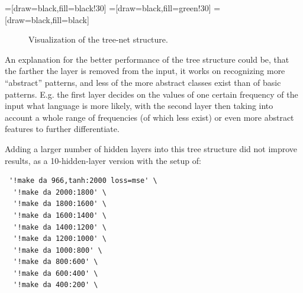 =[draw=black,fill=black!30]
=[draw=black,fill=green!30]
=[draw=black,fill=black]
\begin{figure}[htbp]
   \centering
   \caption{Visualization of the tree-net structure.}
   \label{fig:treeNet}
\end{figure}

An explanation for the better performance of the tree structure could be, that the farther the layer is removed from the input, it works on recognizing more ``abstract'' patterns, and less of the more abstract classes exist than of basic patterns. E.g. the first layer decides on the values of one certain frequency of the input what language is more likely, with the second layer then taking into account a whole range of frequencies (of which less exist) or even more abstract features to further differentiate.

Adding a larger number of hidden layers into this tree structure did not improve results, as a 10-hidden-layer version with the setup of:

\begin{verbatim}
 '!make da 966,tanh:2000 loss=mse' \
  '!make da 2000:1800' \
  '!make da 1800:1600' \
  '!make da 1600:1400' \
  '!make da 1400:1200' \
  '!make da 1200:1000' \
  '!make da 1000:800' \
  '!make da 800:600' \
  '!make da 600:400' \
  '!make da 400:200' \
\end{verbatim}

